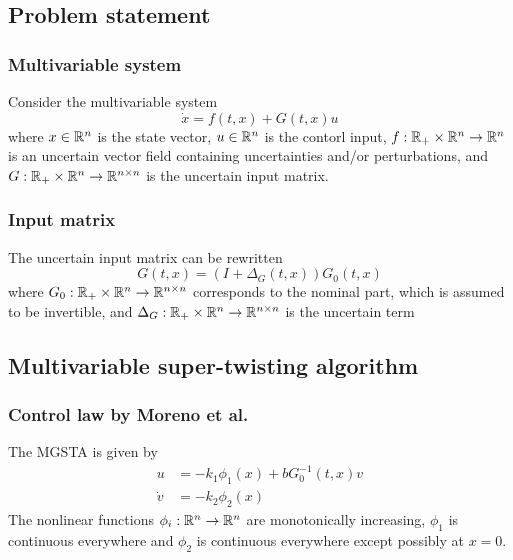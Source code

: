 \subsection{Problem statement}
\subsubsection{Multivariable system}
Consider the multivariable system
\begin{equation}
    \dot{x} = f(t, x) + G(t, x)u
    \label{eq:moreno-system}
\end{equation}
where $x \in \mathbb{R}^n$ is the state vector, $u \in \mathbb{R}^n$ is the contorl input, $f: \mathbb{R}_+ \times \mathbb{R}^n \rightarrow \mathbb{R}^n$ is an uncertain vector field containing uncertainties and/or perturbations, and $G: \mathbb{R}_+ \times \mathbb{R}^n \rightarrow \mathbb{R}^{n \times n}$ is the uncertain input matrix.

\subsubsection{Input matrix}
The uncertain input matrix can be rewritten
\begin{equation}
    G(t, x) = \left(I + \Delta_G(t, x)\right)G_0(t, x)
\end{equation}
where $G_0: \mathbb{R}_+ \times \mathbb{R}^n \rightarrow \mathbb{R}^{n \times n}$ corresponds to the nominal part, which is assumed to be invertible, and $\Delta_G: \mathbb{R}_+ \times \mathbb{R}^n \rightarrow \mathbb{R}^{n \times n}$ is the uncertain term

\subsection{Multivariable super-twisting algorithm}
\subsubsection{Control law by Moreno et al. \cite{Mor:21}}
The MGSTA is given by
\begin{equation}
    \begin{split}
        u &= -k_1\phi_1(x) + bG_0^{-1}(t, x)v \\
        \dot{v} &= -k_2\phi_2(x)
    \end{split}
    \label{eq:moreno-controller}
\end{equation}
The nonlinear functions $\phi_i: \mathbb{R}^n \rightarrow \mathbb{R}^n$ are monotonically increasing, $\phi_1$ is continuous everywhere and $\phi_2$ is continuous everywhere except possibly at $x=0$.


